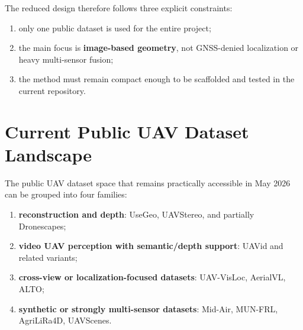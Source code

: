 \documentclass[11pt,a4paper]{article}
\begin{document}
The reduced design therefore follows three explicit constraints:
\begin{enumerate}[leftmargin=1.5em]
  \item only one public dataset is used for the entire project;
  \item the main focus is \textbf{image-based geometry}, not GNSS-denied localization or heavy multi-sensor fusion;
  \item the method must remain compact enough to be scaffolded and tested in the current repository.
\end{enumerate}

\section{Current Public UAV Dataset Landscape}

The public UAV dataset space that remains practically accessible in May 2026 can be grouped into four families:
\begin{enumerate}[leftmargin=1.5em]
  \item \textbf{reconstruction and depth}: UseGeo, UAVStereo, and partially Dronescapes;
  \item \textbf{video UAV perception with semantic/depth support}: UAVid and related variants;
  \item \textbf{cross-view or localization-focused datasets}: UAV-VisLoc, AerialVL, ALTO;
  \item \textbf{synthetic or strongly multi-sensor datasets}: Mid-Air, MUN-FRL, AgriLiRa4D, UAVScenes.
\end{enumerate}
\end{document}
